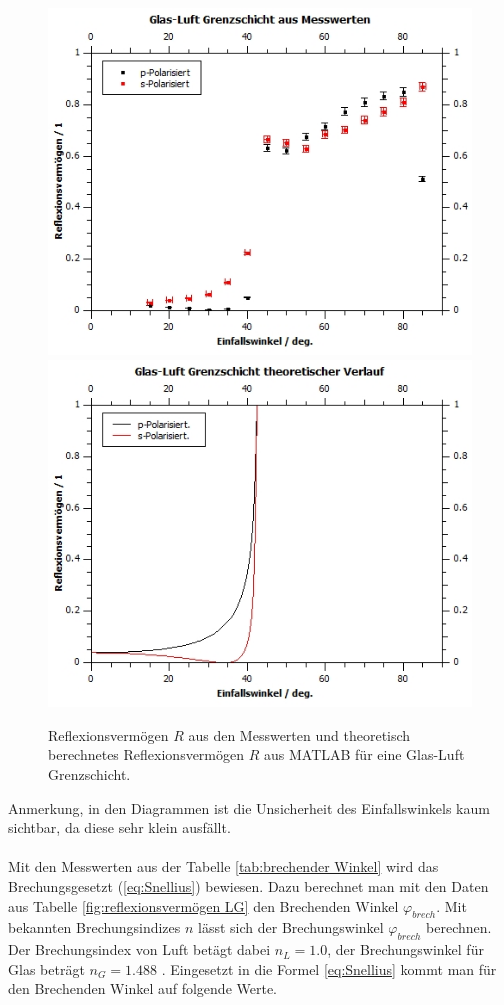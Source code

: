 \documentclass[12pt,a4paper,twoside]{article}
\begin{document}
\begin{figure}[H]
    \centering
    \includegraphics[width=0.6\linewidth]{nudes/GL Mess.jpg}
    \includegraphics[width=0.6\linewidth]{nudes/GL theor.jpg}
    \caption{Reflexionsvermögen $R$ aus den Messwerten und theoretisch berechnetes Reflexionsvermögen $R$ aus MATLAB für eine Glas-Luft Grenzschicht. }
    \label{fig:reflexionsvermögen GL}
\end{figure}

\noindent
Anmerkung, in den Diagrammen ist die Unsicherheit des Einfallswinkels kaum sichtbar, da diese sehr klein ausfällt. 
\\
\\
Mit den Messwerten aus der Tabelle \ref{tab:brechender Winkel} wird das Brechungsgesetzt (\ref{eq:Snellius}) bewiesen. 
Dazu berechnet man mit den Daten aus Tabelle \ref{fig:reflexionsvermögen LG} den Brechenden Winkel $\varphi_{brech}$. 
Mit bekannten Brechungsindizes $n$ lässt sich der Brechungswinkel $\varphi_{brech}$ berechnen. 
Der Brechungsindex von Luft betägt dabei $n_L = 1.0$, der Brechungswinkel für Glas beträgt $n_G = 1.488$ \cite{teachcenter2}. 
Eingesetzt in die Formel \ref{eq:Snellius} kommt man für den Brechenden Winkel auf folgende Werte. 
\end{document}
